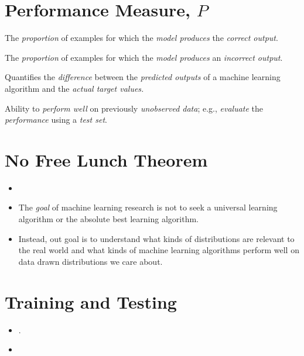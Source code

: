 \documentclass[
	number={1},
	title={Machine Learning Fundamentals}
]{cs584notes}
\begin{document}
\section{Performance Measure, $P$}\label{sec:performance-measure-$p$}
\begin{description}[font=\color{emphblue}]
	\item[Accuracy:] The \emph{proportion} of examples for which the \emph{model produces} the \emph{correct output}.
	\item[Error rate:] The \emph{proportion} of examples for which the \emph{model produces} an \emph{incorrect output}.
	\item[Loss function:] Quantifies the \emph{difference} between the \emph{predicted outputs} of a machine learning algorithm and the \emph{actual target values.}
	\item[Generalization] Ability to \emph{perform well} on previously \emph{unobserved data}; e.g., \emph{evaluate} the \emph{performance} using a \emph{test set}.
\end{description}

\section{No Free Lunch Theorem}\label{sec:no-free-lunch-theorem}
\begin{itemize}
	\item {}
	\item The \emph{goal} of machine learning research is not to seek a universal learning algorithm or the absolute best learning algorithm.
	\item Instead, out goal is to understand what kinds of distributions are relevant to the real world and what kinds of machine learning algorithms perform well on data drawn distributions we care about.
\end{itemize}

\section{Training and Testing}\label{sec:training-and-testing}
\begin{itemize}
	\item {}.
	\item {}
\end{itemize}
\end{document}
